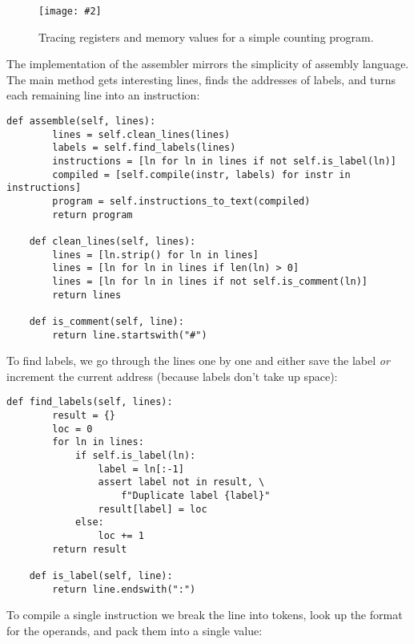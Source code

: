 \documentclass{scrbook}
\newcommand{\figpdf}[4]{\begin{figure}%
\centering%
\texttt{[image: \#2]}%
\caption{#3}%
\label{#1}%
\end{figure}}
\begin{document}
\figpdf{vm-trace-counter}{./vm/trace_counter.pdf}{Tracing registers and memory values for a simple counting program.}{0.6}


The implementation of the assembler mirrors the simplicity of assembly language.
The main method gets interesting lines,
finds the addresses of labels,
and turns each remaining line into an instruction:


\begin{lstlisting}[frame=single,frameround=tttt]
    def assemble(self, lines):
        lines = self.clean_lines(lines)
        labels = self.find_labels(lines)
        instructions = [ln for ln in lines if not self.is_label(ln)]
        compiled = [self.compile(instr, labels) for instr in instructions]
        program = self.instructions_to_text(compiled)
        return program

    def clean_lines(self, lines):
        lines = [ln.strip() for ln in lines]
        lines = [ln for ln in lines if len(ln) > 0]
        lines = [ln for ln in lines if not self.is_comment(ln)]
        return lines

    def is_comment(self, line):
        return line.startswith("#")
\end{lstlisting}



To find labels,
we go through the lines one by one
and either save the label \emph{or} increment the current address
(because labels don't take up space):


\begin{lstlisting}[frame=single,frameround=tttt]
    def find_labels(self, lines):
        result = {}
        loc = 0
        for ln in lines:
            if self.is_label(ln):
                label = ln[:-1]
                assert label not in result, \
                    f"Duplicate label {label}"
                result[label] = loc
            else:
                loc += 1
        return result

    def is_label(self, line):
        return line.endswith(":")
\end{lstlisting}



To compile a single instruction we break the line into tokens,
look up the format for the operands,
and pack them into a single value:
\end{document}
